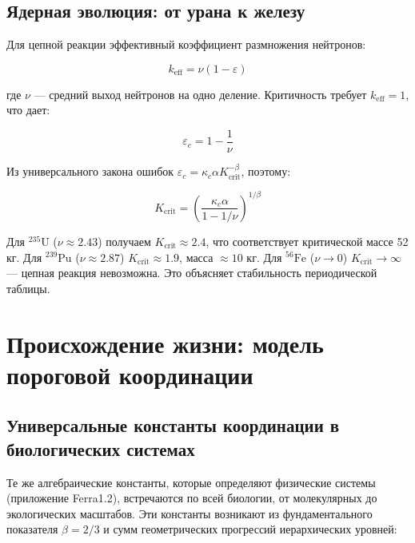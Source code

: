 \documentclass[12pt,a4paper]{article}
\theoremstyle{remark}
\newcommand{\kappac}{\kappa_c}
\newcommand{\eps}{\varepsilon}
\begin{document}
	\subsection{Ядерная эволюция: от урана к железу}
	\label{subsec:nuclear}
	
	Для цепной реакции эффективный коэффициент размножения нейтронов:
	
	\begin{equation}
		k_{\text{eff}} = \nu (1 - \eps)
		\label{eq:keff-nuclear}
	\end{equation}
	
	где $\nu$ — средний выход нейтронов на одно деление. Критичность требует $k_{\text{eff}} = 1$, что дает:
	
	\begin{equation}
		\eps_c = 1 - \frac{1}{\nu}
		\label{eq:eps-c-nuclear}
	\end{equation}
	
	Из универсального закона ошибок $\eps_c = \kappac \alpha K_{\text{crit}}^{-\beta}$, поэтому:
	
	\begin{equation}
		K_{\text{crit}} = \left( \frac{\kappac \alpha}{1 - 1/\nu} \right)^{1/\beta}
		\label{eq:Kcrit-nuclear}
	\end{equation}
	
	Для $^{235}\text{U}$ ($\nu \approx 2.43$) получаем $K_{\text{crit}} \approx 2.4$, что соответствует критической массе 52 кг. Для $^{239}\text{Pu}$ ($\nu \approx 2.87$) $K_{\text{crit}} \approx 1.9$, масса $\approx 10$ кг. Для $^{56}\text{Fe}$ ($\nu \to 0$) $K_{\text{crit}} \to \infty$ — цепная реакция невозможна. Это объясняет стабильность периодической таблицы.
	
	\section{Происхождение жизни: модель пороговой координации}
	\label{sec:origin-life}
	
	\subsection{Универсальные константы координации в биологических системах}
	\label{subsec:bio-constants}
	
	Те же алгебраические константы, которые определяют физические системы (приложение Ferra1.2), встречаются по всей биологии, от молекулярных до экологических масштабов. Эти константы возникают из фундаментального показателя $\beta = 2/3$ и сумм геометрических прогрессий иерархических уровней:
	
\end{document}
